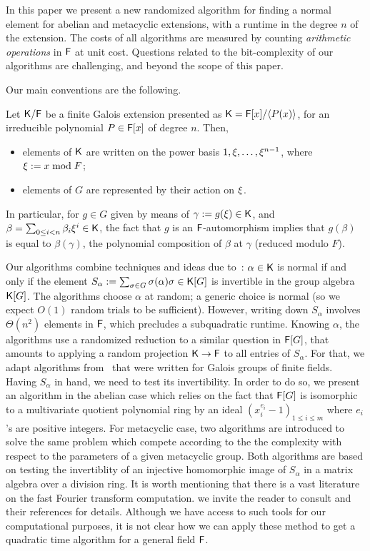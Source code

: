 In this paper we present a new randomized algorithm for finding a normal
element for abelian and metacyclic extensions, with a runtime \alg
in the degree $n$ of the extension. The costs of all algorithms are
measured by counting \emph{arithmetic operations} in ${\mathsf{F}}$ at unit cost.
Questions related to the bit-complexity of our algorithms are challenging,
and beyond the scope of this paper.

Our main conventions are the following.
\begin{assumption}
  \label{assum}
  Let ${\mathsf{K}}/{\mathsf{F}}$ be a finite Galois extension presented as
  ${\mathsf{K}}={\mathsf{F}}[x]/\langle P(x)\rangle$, for an irreducible polynomial $P\in
  {\mathsf{F}}[x]$ of degree $n$. Then,
  \begin{itemize}
  \item elements of ${\mathsf{K}}$ are written on the power basis $1,\xi,\dots,\xi^{n-1}$,
    where $\xi := x \bmod F$;
  \item elements of $G$ are represented by their action on $\xi$.
  \end{itemize}
\end{assumption}

In particular, for $g \in G$ given by means of $\gamma:=g(\xi) \in {\mathsf{K}}$,
and $\beta = \sum_{0\leq i<n}\beta_i\xi^i\in{\mathsf{K}}$, the fact that $g$ is an
${\mathsf{F}}$-automorphism implies that $g(\beta)$ is equal to $\beta(\gamma)$, the
polynomial composition of $\beta$ at $\gamma$ (reduced modulo $F$).

Our algorithms combine techniques and ideas due
to~\cite{GatGie90,KalSho98}: $\alpha \in {\mathsf{K}}$ is normal if and only
if the element $S_\alpha := \sum_{\sigma \in G} \sigma(\alpha)\sigma
\in {\mathsf{K}}[G]$ is invertible in the group algebra ${\mathsf{K}}[G]$. The algorithms
choose $\alpha$ at random; a generic choice is normal (so we expect
$O(1)$ random trials to be sufficient). However, writing down
$S_\alpha$ involves $\Theta(n^2)$ elements in ${\mathsf{F}}$, which precludes a
subquadratic runtime. Knowing $\alpha$, the algorithms use a
randomized reduction to a similar question in ${\mathsf{F}}[G]$, that amounts to
applying a random projection ${\mathsf{K}}\to{\mathsf{F}}$ to all entries of $S_\alpha$.
For that, we adapt algorithms from~\cite{KalSho98} that were written
for Galois groups of finite fields. Having $S_\alpha$ in hand, we need
to test its invertibility. In order to do so, we present an algorithm 
in the abelian case which relies on the fact that ${\mathsf{F}}[G]$ is isomorphic 
to a multivariate quotient polynomial ring by an ideal $(x^{e_i}_i-1)_{1 \leq i \leq m}$
where $e_i$'s are positive integers. For metacyclic case, two algorithms
are introduced to solve the same problem which compete according to the 
the complexity with respect to the parameters of a given metacyclic group.
Both algorithms are based on testing the invertiblity of an injective
homomorphic image of $S_\alpha$ in a matrix algebra over a division ring.
It is worth mentioning that there is a vast literature on the fast Fourier
transform computation. we invite the reader to consult \cite{Cla89, Rock90, 
ClaMu04, DiaRock90, Beth87} and their references for details. 
Although we have access to such tools for 
our computational purposes, it is not clear how we can apply these method 
to get a quadratic time algorithm for a general field ${\mathsf{F}}$.


